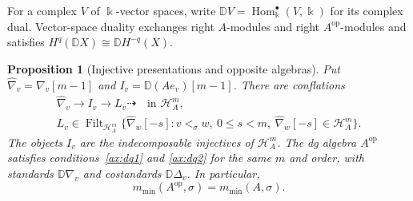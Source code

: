 \documentclass[11pt,a4paper]{article}
\renewcommand{\H}{\mathcal H}
\newcommand{\op}{\mathrm{op}}
\newcommand{\std}{\Delta}
\newcommand{\costd}{\nabla}
\newcommand{\dual}{\mathbb D}
\DeclareMathOperator{\Hom}{Hom}
\DeclareMathOperator{\Filt}{Filt}
\theoremstyle{plain}
\newtheorem{proposition}[theorem]{Proposition}
\theoremstyle{definition}
\numberwithin{equation}{section}
\begin{document}
For a complex $V$ of $\Bbbk$-vector spaces, write
$\dual V=\Hom^\bullet_{\Bbbk}(V,\Bbbk)$ for its complex dual.
Vector-space duality exchanges right $A$-modules and right
$A^{\op}$-modules and satisfies
$H^q(\dual X)\cong\dual H^{-q}(X)$.

\begin{proposition}[Injective presentations and opposite algebras]
\label{adv:opposite}
Put $\widehat\costd_v=\costd_v[m-1]$ and
$I_v=\dual(Ae_v)[m-1]$. There are conflations
\begin{equation}\label{adv:injective}
 \begin{gathered}
 \widehat\costd_v\longrightarrow I_v\longrightarrow L_v
 \dashrightarrow\quad\text{in }\H_A^m,\\
 L_v\in\Filt_{\H_A^m}
 \{\widehat\costd_w[-s]:v<_\sigma w,\ 0\leq s<m,\
                    \widehat\costd_w[-s]\in\H_A^m\}.
 \end{gathered}
\end{equation}
The objects $I_v$ are the indecomposable injectives of $\H_A^m$.
The dg algebra $A^{\op}$ satisfies conditions~\ref{ax:dq1} and
\ref{ax:dq2} for the same $m$ and order, with standards
$\dual\costd_v$ and costandards $\dual\std_v$.
In particular,
\begin{equation}\label{adv:opposite-width}
 m_{\min}(A^{\op},\sigma)=m_{\min}(A,\sigma).
\end{equation}
\end{proposition}
\end{document}

